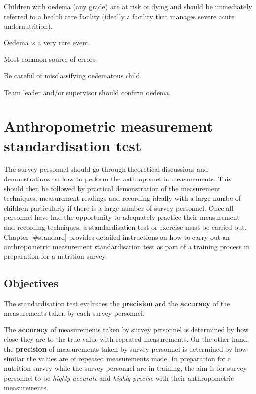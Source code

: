 \documentclass[12pt,]{book}
\theoremstyle{definition}
\theoremstyle{definition}
\theoremstyle{definition}
\theoremstyle{remark}
\let\BeginKnitrBlock\begin \let\EndKnitrBlock\end
\begin{document}
\BeginKnitrBlock{rmdnote}
Children with oedema (any grade) are at risk of dying and should be
immediately referred to a health care facility (ideally a facility that
manages severe acute undernutrition).
\EndKnitrBlock{rmdnote}

\BeginKnitrBlock{rmdremind}
\item 

Oedema is a very rare event.

\item 

Most common source of errors.

\item 

Be careful of misclassifying oedematous child.

\item 

Team leader and/or supervisor should confirm oedema.
\EndKnitrBlock{rmdremind}

\hypertarget{standard}{%
\chapter{Anthropometric measurement standardisation
test}\label{standard}}

The survey personnel should go through theoretical discussions and
demonstrations on how to perform the anthropometric measurements. This
should then be followed by practical demonstration of the measurement
techniques, measurement readings and recording ideally with a large
numbe of children particularly if there is a large number of survey
personnel. Once all personnel have had the opportunity to adequately
practice their measurement and recording techniques, a standardisation
test or exercise must be carried out. Chapter {[}\#standard{]} provides
detailed instructions on how to carry out an anthropometric measurement
standardisation test as part of a training process in preparation for a
nutrition survey.

\hypertarget{objectives}{%
\section{Objectives}\label{objectives}}

The standardisation test evaluates the \textbf{precision} and the
\textbf{accuracy} of the measurements taken by each survey personnel.

The \textbf{accuracy} of measurements taken by survey personnel is
determined by how close they are to the true value with repeated
measurements. On the other hand, the \textbf{precision} of measurements
taken by survey personnel is determined by how similar the values are of
repeated measurements made. In preparation for a nutrition survey while
the survey personnel are in training, the aim is for survey personnel to
be \emph{highly accurate} and \emph{highly precise} with their
anthropometric measurements.
\end{document}
